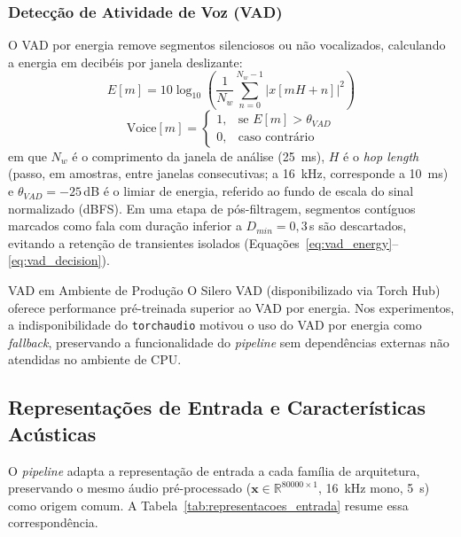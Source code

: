 \documentclass[12pt,a4paper]{article}
\begin{document}
\subsubsection*{Detecção de Atividade de Voz (VAD)}

O VAD por energia remove segmentos silenciosos ou não vocalizados,
calculando a energia em decibéis por janela deslizante:
\begin{equation}
\label{eq:vad_energy}
E[m] = 10\log_{10}\!\left(\frac{1}{N_w}\sum_{n=0}^{N_w-1}|x[mH+n]|^2\right)
\end{equation}
\begin{equation}
\label{eq:vad_decision}
\text{Voice}[m] = \begin{cases}
1, & \text{se } E[m] > \theta_{VAD}\\
0, & \text{caso contrário}
\end{cases}
\end{equation}
\noindent
em que $N_w$ é o comprimento da janela de análise (\SI{25}{\milli\second}),
$H$ é o \textit{hop length} (passo, em amostras, entre janelas consecutivas;
a \SI{16}{\kilo\hertz}, corresponde a \SI{10}{\milli\second}) e
$\theta_{VAD} = -25$\,dB é o limiar de energia, referido ao fundo de escala do
sinal normalizado (dBFS). Em uma etapa de pós-filtragem, segmentos contíguos
marcados como fala com duração inferior a $D_{min} = 0{,}3$\,s são
descartados, evitando a retenção de transientes isolados
(Equações~\ref{eq:vad_energy}--\ref{eq:vad_decision}).

\begin{infobox}{VAD em Ambiente de Produção}
O Silero VAD (disponibilizado via Torch Hub) oferece performance pré-treinada
superior ao VAD por energia. Nos experimentos, a indisponibilidade do
\texttt{torchaudio} motivou o uso do VAD por energia como \textit{fallback},
preservando a funcionalidade do \textit{pipeline} sem dependências externas
não atendidas no ambiente de CPU.
\end{infobox}

\newpage

\subsection{Representações de Entrada e Características Acústicas}
\label{sec:caracteristicas}

O \textit{pipeline} adapta a representação de entrada a cada família de
arquitetura, preservando o mesmo áudio pré-processado
($\mathbf{x} \in \mathbb{R}^{80000\times1}$, \SI{16}{\kilo\hertz} mono,
\SI{5}{\second}) como origem comum. A Tabela~\ref{tab:representacoes_entrada}
resume essa correspondência.
\end{document}
